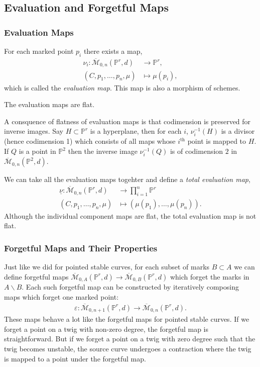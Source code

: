 \subsection{Evaluation and Forgetful Maps}
\subsubsection{Evaluation Maps}
For each marked point $p_{i}$ there exists a map,
\begin{align*}
    \nu_{i}: \overline{\mathcal{M}}_{0,n}(\mathbb{P}^{r},d) &\to \mathbb{P}^{r},\\
    (C,p_{1}, \dots, p_{n}, \mu) & \mapsto \mu(p_{i}),
\end{align*}
which is called the \textit{evaluation map}. This map is also a morphism of schemes.

\begin{lemma}
    The evaluation maps are flat.
\end{lemma}

A consquence of flatness of evaluation maps is that codimension is preserved for inverse images.
Say $H \subset \mathbb{P}^{r}$ is a hyperplane, then for each $i$, $\nu^{-1}_{i}(H)$ is a divisor (hence codimension 1) which consists of all maps whose $i^{\text{th}}$ point is mapped to $H$.
If $Q$ is a point in $\mathbb{P}^{2}$ then the inverse image $\nu_{i}^{-1}(Q)$ is of codimension $2$ in $\mathbb{\overline{\mathcal{M}}}_{0,n}(\mathbb{P}^{2},d)$.

\begin{remark}
    We can take all the evaluation maps togehter and define a \textit{total evaluation map},
\begin{align*}
    \underline{\nu}: \overline{\mathcal{M}}_{0,n}(\mathbb{P}^{r},d) &\to \prod_{i=1}^{n}\mathbb{P}^{r}\\
    (C,p_{1}, \dots, p_{n}, \mu) & \mapsto \left(\mu(p_{1}), \dots,\mu(p_{n}) \right).
\end{align*}
Although the individual component maps are flat, the total evaluation map is not flat.
\end{remark}

\subsubsection{Forgetful Maps and Their Properties}
Just like we did for pointed stable curves, for each subset of marks $B\subset A$ we can define forgetful maps $\overline{\mathcal{M}}_{0,A}(\mathbb{P}^{r},d) \to \overline{\mathcal{M}}_{0,B}(\mathbb{P}^{r},d)$ which forget the marks in $A \backslash B$.
Each such forgetful map can be constructed by iteratively composing maps which forget one marked point:
\begin{align*}
    \varepsilon : \overline{\mathcal{M}}_{0,n+1}(\mathbb{P}^{r},d) \to \overline{\mathcal{M}}_{0,n}(\mathbb{P}^{r},d).
\end{align*}
These maps behave a lot like the forgetful maps for pointed stable curves.
If we forget a point on a twig with non-zero degree, the forgetful map is straightforward.
But if we forget a point on a twig with zero degree such that the twig becomes unstable, the source curve undergoes a contraction where the twig is mapped to a point under the forgetful map.

